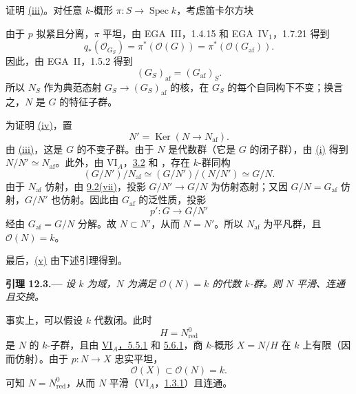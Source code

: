 证明 \hyperref[thm:sga3-VIB-12.2-iii]{\textup{(iii)}}。对任意 \(k\)-概形 \(\pi:S\to\operatorname{Spec}k\)，考虑笛卡尔方块
\begin{center}
  \label{diag:sga3-VIB-12.2-base-change}%
\end{center}
由于 \(p\) 拟紧且分离，\(\pi\) 平坦，由 EGA~III，1.4.15 和 EGA~IV\(_1\)，1.7.21 得到
\label{form:sga3-VIB-12.2-base-change-global-sections}%
\[
  q_*(\mathcal O_{G_S})
   =\pi^*(\mathcal O(G))
   =\pi^*(\mathcal O(G_{\mathrm{af}})).
\]
因此，由 EGA~II，1.5.2 得到
\[
  (G_S)_{\mathrm{af}}=(G_{\mathrm{af}})_S.
\]
所以 \(N_S\) 作为典范态射 \(G_S\to(G_S)_{\mathrm{af}}\) 的核，在 \(G_S\) 的每个自同构下不变；换言之，\(N\) 是 \(G\) 的特征子群。

为证明 \hyperref[thm:sga3-VIB-12.2-iv]{\textup{(iv)}}，置
\[
  N'=\operatorname{Ker}(N\longrightarrow N_{\mathrm{af}}).
\]
由 \hyperref[thm:sga3-VIB-12.2-iii]{\textup{(iii)}}，这是 \(G\) 的不变子群。由于 \(N\) 是代数群\textup{（它是 \(G\) 的闭子群）}，由 \hyperref[thm:sga3-VIB-12.2-i]{\textup{(i)}} 得到 \(N/N'\simeq N_{\mathrm{af}}\)。此外，由 VI\(_A\)，\hyperref[thm:sga3-VIA-3.2]{3.2} 和 ，存在 \(k\)-群同构
\label{form:sga3-VIB-12.2-double-quotient}%
\[
  (G/N')/N_{\mathrm{af}}
    \simeq (G/N')/(N/N')
    \simeq G/N.
\]
由于 \(N_{\mathrm{af}}\) 仿射，由 \hyperref[prop:sga3-VIB-9.2]{9.2\textup{(vii)}}，投影 \(G/N'\to G/N\) 为仿射态射；又因 \(G/N=G_{\mathrm{af}}\) 仿射，\(G/N'\) 也仿射。因此由 \(G_{\mathrm{af}}\) 的泛性质，投影
\[
  p':G\longrightarrow G/N'
\]
经由 \(G_{\mathrm{af}}=G/N\) 分解。故 \(N\subset N'\)，从而 \(N=N'\)。所以 \(N_{\mathrm{af}}\) 为平凡群，且 \(\mathcal O(N)=k\)。

最后，\hyperref[thm:sga3-VIB-12.2-v]{\textup{(v)}} 由下述引理得到。

\medskip
{}\label{lem:sga3-VIB-12.3}%
\noindent\textbf{引理 12.3.---}
\emph{设 \(k\) 为域，\(N\) 为满足 \(\mathcal O(N)=k\) 的代数 \(k\)-群。则 \(N\) 平滑、连通且交换。}

事实上，可以假设 \(k\) 代数闭。此时
\[
  H=N_{\mathrm{red}}^0
\]
是 \(N\) 的 \(k\)-子群，且由 \hyperref[prop:sga3-VIA-5.5.1]{VI\(_A\)，5.5.1} 和 \hyperref[prop:sga3-VIA-5.6.1]{5.6.1}，商 \(k\)-概形 \(X=N/H\) 在 \(k\) 上有限\textup{（因而仿射）}。由于 \(p:N\to X\) 忠实平坦，
\[
  \mathcal O(X)\subset\mathcal O(N)=k.
\]
可知 \(N=N_{\mathrm{red}}^0\)，从而 \(N\) 平滑\textup{（VI\(_A\)，\hyperref[prop:sga3-VIA-1.3.1]{1.3.1}）}且连通。

